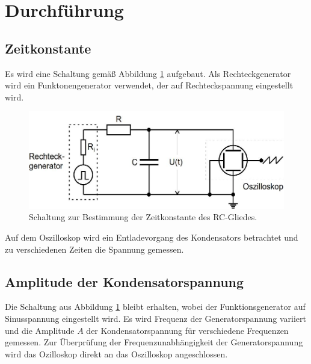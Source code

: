 \section{Durchführung}
\label{sec:Durchführung}
\subsection{Zeitkonstante}
Es wird eine Schaltung gemäß Abbildung \ref{fig:a}
aufgebaut. Als Rechteckgenerator wird ein Funktonengenerator verwendet, der auf Rechteckspannung eingestellt wird.
\begin{figure}
\centering
\includegraphics[scale=0.5]{content/images/a.jpg}
\caption{Schaltung zur Bestimmung der Zeitkonstante des RC-Gliedes.\cite{V353}}
\label{fig:a}
\end{figure}
\newline Auf dem Oszilloskop wird ein Entladevorgang des Kondensators betrachtet und zu verschiedenen Zeiten die Spannung gemessen.
\subsection{Amplitude der Kondensatorspannung}
Die Schaltung aus Abbildung \ref{fig:a} bleibt erhalten, wobei der Funktionsgenerator auf Sinusspannung eingestellt wird.
Es wird Frequenz der Generatorspannung variiert und die Amplitude $A$ der Kondensatorspannung für verschiedene Frequenzen gemessen.
Zur Überprüfung der Frequenzunabhängigkeit der Generatorspannung wird das Ozilloskop direkt an das Oszilloskop angeschlossen.
